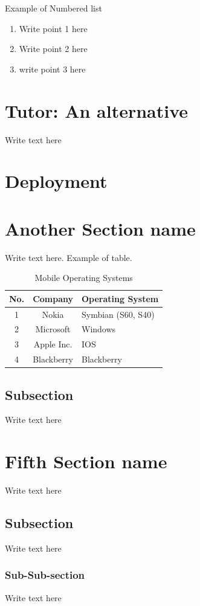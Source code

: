 \documentclass[12pt]{article}
\begin{document}
Example of Numbered list
\begin{enumerate}
 \item Write point 1 here
 \item Write point 2 here
 \item write point 3 here
\end{enumerate}

\section{Tutor: An alternative}
Write text here

\section{Deployment}
\pagebreak

\section{Another Section name}
Write text here. Example of table.
\begin{table}[H]
\begin{center}
\begin{tabular}{|c|c|p{4cm}|}
 \hline
 \textbf{No.} & \textbf{Company} & \textbf{Operating System} \\
 \hline
 1 & Nokia & Symbian (S60, S40) \\
 \hline
 2 & Microsoft & Windows \\
 \hline
 3 & Apple Inc. & IOS \\
 \hline
 4 & Blackberry & Blackberry \\
 \hline
\end{tabular}
 \caption{Mobile Operating Systems}
 \end{center}
\end{table}

\subsection{Subsection}
Write text here


\section{Fifth Section name}
Write text here

\subsection{Subsection}
Write text here

\subsubsection{Sub-Sub-section}
Write text here



\end{document}
